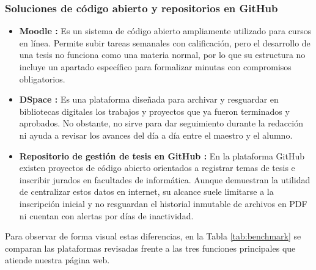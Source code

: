 \subsubsection{Soluciones de código abierto y repositorios en GitHub}
\begin{itemize}
    \item \textbf{Moodle \parencite{moodle2024lms}:} Es un sistema de código abierto ampliamente utilizado para cursos en línea. Permite subir tareas semanales con calificación, pero el desarrollo de una tesis no funciona como una materia normal, por lo que su estructura no incluye un apartado específico para formalizar minutas con compromisos obligatorios.
    \item \textbf{DSpace \parencite{duraspace2024dspace}:} Es una plataforma diseñada para archivar y resguardar en bibliotecas digitales los trabajos y proyectos que ya fueron terminados y aprobados. No obstante, no sirve para dar seguimiento durante la redacción ni ayuda a revisar los avances del día a día entre el maestro y el alumno.
    \item \textbf{Repositorio de gestión de tesis en GitHub \parencite{singh2023thesisrepo}:} En la plataforma GitHub existen proyectos de código abierto orientados a registrar temas de tesis e inscribir jurados en facultades de informática. Aunque demuestran la utilidad de centralizar estos datos en internet, su alcance suele limitarse a la inscripción inicial y no resguardan el historial inmutable de archivos en PDF ni cuentan con alertas por días de inactividad.
\end{itemize}

Para observar de forma visual estas diferencias, en la Tabla \ref{tab:benchmark} se comparan las plataformas revisadas frente a las tres funciones principales que atiende nuestra página web.

